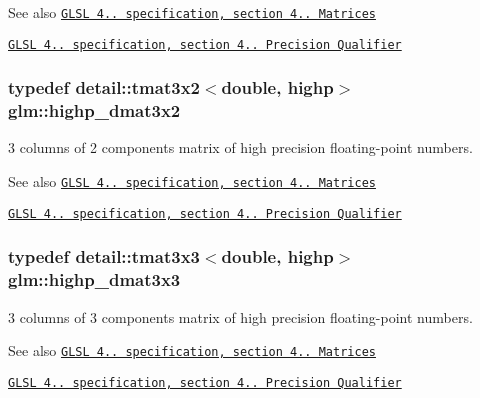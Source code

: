\begin{DoxySeeAlso}{See also}
\href{http://www.opengl.org/registry/doc/GLSLangSpec.4.20.8.pdf}{\tt G\+L\+SL 4.. specification, section 4.. Matrices} 

\href{http://www.opengl.org/registry/doc/GLSLangSpec.4.20.8.pdf}{\tt G\+L\+SL 4.. specification, section 4.. Precision Qualifier} 
\end{DoxySeeAlso}
\subsubsection[{\texorpdfstring{highp\+\_\+dmat3x2}{highp_dmat3x2}}]{\setlength{\rightskip}{0pt plus 5cm}typedef detail\+::tmat3x2$<$double, highp$>$ {\bf glm\+::highp\+\_\+dmat3x2}}\hypertarget{group__core__precision_gac956fe6b946f0ccee78367ccd5427351}{}\label{group__core__precision_gac956fe6b946f0ccee78367ccd5427351}
3 columns of 2 components matrix of high precision floating-\/point numbers.

\begin{DoxySeeAlso}{See also}
\href{http://www.opengl.org/registry/doc/GLSLangSpec.4.20.8.pdf}{\tt G\+L\+SL 4.. specification, section 4.. Matrices} 

\href{http://www.opengl.org/registry/doc/GLSLangSpec.4.20.8.pdf}{\tt G\+L\+SL 4.. specification, section 4.. Precision Qualifier} 
\end{DoxySeeAlso}
\subsubsection[{\texorpdfstring{highp\+\_\+dmat3x3}{highp_dmat3x3}}]{\setlength{\rightskip}{0pt plus 5cm}typedef detail\+::tmat3x3$<$double, highp$>$ {\bf glm\+::highp\+\_\+dmat3x3}}\hypertarget{group__core__precision_gad7229dea82287910d88e6e8566e39fc7}{}\label{group__core__precision_gad7229dea82287910d88e6e8566e39fc7}
3 columns of 3 components matrix of high precision floating-\/point numbers.

\begin{DoxySeeAlso}{See also}
\href{http://www.opengl.org/registry/doc/GLSLangSpec.4.20.8.pdf}{\tt G\+L\+SL 4.. specification, section 4.. Matrices} 

\href{http://www.opengl.org/registry/doc/GLSLangSpec.4.20.8.pdf}{\tt G\+L\+SL 4.. specification, section 4.. Precision Qualifier} 
\end{DoxySeeAlso}
